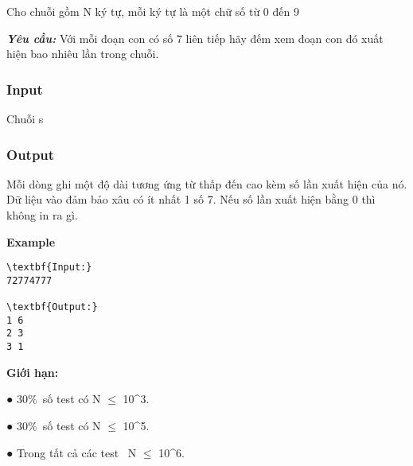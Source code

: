 

Cho chuỗi gồm N ký tự, mỗi ký tự là một chữ số từ 0 đến 9

\textbf{\emph{Yêu cầu: }} Với mỗi đoạn con có số 7 liên tiếp hãy đếm xem đoạn con đó xuất hiện bao nhiêu lần trong chuỗi.

\subsubsection{Input}

Chuỗi s

\subsubsection{Output}

Mỗi dòng ghi một độ dài tương ứng từ thấp đến cao kèm số lần xuất hiện của nó. Dữ liệu vào đảm bảo xâu có ít nhất 1 số 7. Nếu số lần xuất hiện bằng 0 thì không in ra gì.

\textbf{Example }
\begin{verbatim}
\textbf{Input:}
72774777

\textbf{Output:}
1 6
2 3
3 1
\end{verbatim}

\textbf{Giới hạn:}

● 30\% số test có N  $\le$  10^3.

● 30\% số test có N  $\le$  10^5.

● Trong tất cả các test  N  $\le$  10^6.
